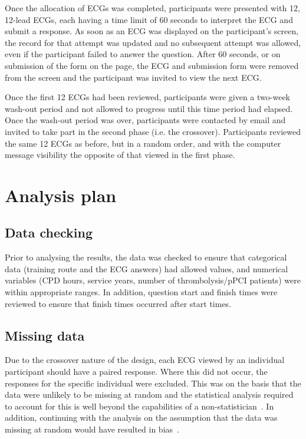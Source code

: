 Once the allocation of ECGs was completed, participants were presented with 12, 12-lead ECGs, each having a time limit of 60 seconds to interpret the ECG and submit a response. As soon as an ECG was displayed on the participant's screen, the record for that attempt was updated and no subsequent attempt was allowed, even if the participant failed to answer the question. After 60 seconds, or on submission of the form on the page, the ECG and submission form were removed from the screen and the participant was invited to view the next ECG. 

Once the first 12 ECGs had been reviewed, participants were given a two-week wash-out period and not allowed to progress until this time period had elapsed. Once the wash-out period was over, participants were contacted by email and invited to take part in the second phase (i.e. the crossover). Participants reviewed the same 12 ECGs as before, but in a random order, and with the computer message visibility the opposite of that viewed in the first phase. 

\section{Analysis plan}
\label{analysisplan}

\subsection{Data checking}
\label{datachecking}

Prior to analysing the results, the data was checked to ensure that categorical data (training route and the ECG answers) had allowed values, and numerical variables (CPD hours, service years, number of thrombolysis\slash pPCI patients) were within appropriate ranges. In addition, question start and finish times were reviewed to ensure that finish times occurred after start times. 

\subsection{Missing data}
\label{missingdata}

Due to the crossover nature of the design, each ECG viewed by an individual participant should have a paired response. Where this did not occur, the responses for the specific individual were excluded. This was on the basis that the data were unlikely to be missing at random and the statistical analysis required to account for this is well beyond the capabilities of a non-statistician~\citep{ho_dropouts_2012}. In addition, continuing with the analysis on the assumption that the data was missing at random would have resulted in bias~\citep{baraldi_introduction_2010}.

